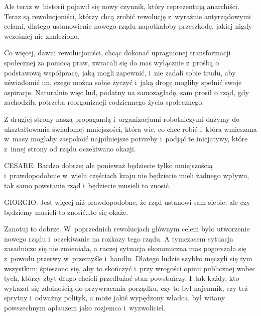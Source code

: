 \documentclass[oneside,polish,11pt,sfheadings]{mwbk}
\begin{document}
 
Ale teraz w~historii pojawił się nowy czynnik, który reprezentują anarchiści. Teraz są rewolucjoniści, którzy chcą
zrobić rewolucję z~wyraźnie antyrządowymi celami, dlatego ustanowienie nowego rządu napotkałoby przeszkodę, jakiej
nigdy wcześniej nie znaleziono. 

 
Co więcej, dawni rewolucjoniści, chcąc dokonać upragnionej transformacji społecznej za pomocą praw, zwracali się do mas
wyłącznie z~prośbą o podstawową współpracę, jaką mogli zapewnić, i~nie zadali sobie trudu, aby uświadomić im, czego
można sobie życzyć i~jaką drogę mogliby spełnić swoje aspiracje. Naturalnie więc lud, podatny na samozagładę, sam
prosił o rząd, gdy zachodziła potrzeba reorganizacji codziennego życia społecznego. 

 
Z drugiej strony naszą propagandą i~organizacjami robotniczymi dążymy do ukształtowania świadomej mniejszości, która
wie, co chce robić i~która wmieszana w~masy mogłaby zaspokoić najpilniejsze potrzeby i~podjąć te inicjatywy, które z~innej strony od rządu oczekiwano okazji. 




 
\noindent CESARE: Bardzo dobrze; ale ponieważ będziecie tylko mniejszością i~prawdopodobnie w~wielu częściach kraju nie będziecie
mieli żadnego wpływu, tak samo powstanie rząd i~będziecie musieli to znosić. 




 
\noindent GIORGIO: Jest więcej niż prawdopodobne, że rząd ustanowi sam siebie; ale czy będziemy musieli to znosić\ldots to się
okaże. 

 
Zanotuj to dobrze. W~poprzednich rewolucjach głównym celem było utworzenie nowego rządu i~oczekiwanie na rozkazy tego
rządu.  A tymczasem sytuacja zasadniczo się nie zmieniała, a raczej sytuacja ekonomiczna mas pogorszała się z~powodu
przerwy w~przemyśle i~handlu. Dlatego ludzie szybko męczyli się tym wszystkim;  śpieszono się, aby to skończyć i~przy
wrogości opinii publicznej wobec tych, którzy zbyt długo chcieli przedłużać stan powstańczy. I~tak każdy, kto wykazał
się zdolnością do przywracania porządku, czy to był najemnik, czy też sprytny i~odważny polityk, a może jakiś wypędzony
władca, był witany powszechnym aplauzem jako rozjemca i~wyzwoliciel.  
\end{document}
